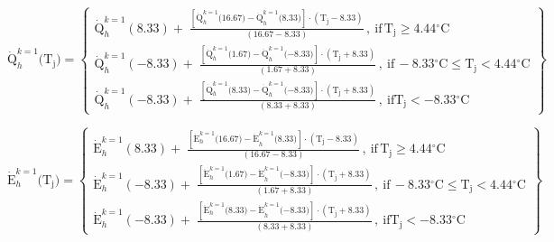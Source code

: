 \begin{equation}
{\mathrm{\dot Q}}_h^{k = 1}{\mathrm{(}}{{\mathrm{T}}_{\mathrm{j}}}{\mathrm{) = }}\left\{
    \begin{array}{l}
      {\mathrm{\dot Q}}_h^{k = 1}(8.33) + \;\frac{{\left[ {{\mathrm{\dot Q}}_h^{k = 1}{\mathrm{(16}}{\mathrm{.67) - \dot Q}}_h^{k = 1}{\mathrm{(8}}{\mathrm{.33)}}} \right] \cdot \left( {{{\mathrm{T}}_{\mathrm{j}}} - 8.33} \right)}}{{\left( {16.67 - 8.33} \right)}}\,{\mathrm{,~if }}\,{{\mathrm{T}}_{\mathrm{j}}} \ge 4.44{\mathrm{^\circ C}} \\
      {\mathrm{\dot Q}}_h^{k = 1}( - 8.33) + \;\frac{{\left[ {{\mathrm{\dot Q}}_h^{k = 1}{\mathrm{(1}}{\mathrm{.67) - \dot Q}}_h^{k = 1}{\mathrm{( - 8}}{\mathrm{.33)}}} \right] \cdot \left( {{{\mathrm{T}}_{\mathrm{j}}} + 8.33} \right)}}{{\left( {1.67 + 8.33} \right)}}\,{\mathrm{,~if }}\, - 8.33{\mathrm{^\circ C}} \le {{\mathrm{T}}_{\mathrm{j}}} < 4.44{\mathrm{^\circ C}} \\
      {\mathrm{\dot Q}}_h^{k = 1}( - 8.33) + \;\frac{{\left[ {{\mathrm{\dot Q}}_h^{k = 1}{\mathrm{(8}}{\mathrm{.33) - \dot Q}}_h^{k = 1}{\mathrm{( - 8}}{\mathrm{.33)}}} \right] \cdot \left( {{{\mathrm{T}}_{\mathrm{j}}} + 8.33} \right)}}{{\left( {8.33 + 8.33} \right)}}\,{\mathrm{,~if }}{{\mathrm{T}}_{\mathrm{j}}} <  - 8.33{\mathrm{^\circ C}}\,
    \end{array}
  \right\}
\end{equation}

\begin{equation}
{\mathrm{\dot E}}_h^{k = 1}{\mathrm{(}}{{\mathrm{T}}_{\mathrm{j}}}{\mathrm{) = }}\left\{
    \begin{array}{l}
      {\mathrm{\dot E}}_h^{k = 1}(8.33) + \;\frac{{\left[ {{\mathrm{\dot E}}_h^{k = 1}{\mathrm{(16}}{\mathrm{.67) - \dot E}}_h^{k = 1}{\mathrm{(8}}{\mathrm{.33)}}} \right] \cdot \left( {{{\mathrm{T}}_{\mathrm{j}}} - 8.33} \right)}}{{\left( {16.67 - 8.33} \right)}}\,{\mathrm{,~if }}\,{{\mathrm{T}}_{\mathrm{j}}} \ge 4.44{\mathrm{^\circ C}} \\
      {\mathrm{\dot E}}_h^{k = 1}( - 8.33) + \;\frac{{\left[ {{\mathrm{\dot E}}_h^{k = 1}{\mathrm{(1}}{\mathrm{.67) - \dot E}}_h^{k = 1}{\mathrm{( - 8}}{\mathrm{.33)}}} \right] \cdot \left( {{{\mathrm{T}}_{\mathrm{j}}} + 8.33} \right)}}{{\left( {1.67 + 8.33} \right)}}\,{\mathrm{,~if }}\, - 8.33{\mathrm{^\circ C}} \le {{\mathrm{T}}_{\mathrm{j}}} < 4.44{\mathrm{^\circ C}} \\
      {\mathrm{\dot E}}_h^{k = 1}( - 8.33) + \;\frac{{\left[ {{\mathrm{\dot E}}_h^{k = 1}{\mathrm{(8}}{\mathrm{.33) - \dot E}}_h^{k = 1}{\mathrm{( - 8}}{\mathrm{.33)}}} \right] \cdot \left( {{{\mathrm{T}}_{\mathrm{j}}} + 8.33} \right)}}{{\left( {8.33 + 8.33} \right)}}\,{\mathrm{,~if }}{{\mathrm{T}}_{\mathrm{j}}} <  - 8.33{\mathrm{^\circ C}}\,
    \end{array}
  \right\}
\end{equation}

